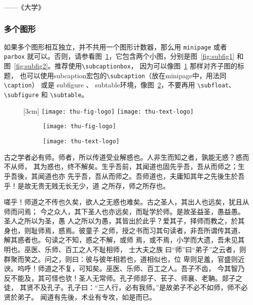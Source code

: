 \hfill ——《大学》


\subsubsection{多个图形}
\label{sec:multifig}

如果多个图形相互独立，并不共用一个图形计数器，那么用 \verb|minipage| 或者
\verb|parbox| 就可以。否则，请参看图~\ref{fig:big1-subcaptionbox}，它包含两个小图，分别是图~\ref{fig:subfig1} 
和图~\ref{fig:subfig2}。推荐使用\verb|\subcaptionbox|，
因为可以像图~\ref{fig:big1-subcaptionbox} 那样对齐子图的标题，
也可以使用\textsf{subcaption}宏包的\verb|\subcaption|（放在minipage中，用法同\verb|\caption|）
或是 subfigure 、 subtable环境，像图~\ref{fig:big1-subfigure}，不要再用 \verb|\subfloat|、
\verb|\subfigure| 和 \verb|\subtable|。
\begin{figure}[h]
  \centering%
  [3cm] %
    {\texttt{[image: thu-fig-logo]}}
      \hspace{4em}%
      {\texttt{[image: thu-text-logo]}}
  \label{fig:big1-subcaptionbox}
\end{figure}
\begin{figure}[h]
  \centering%
  \begin{subfigure}{3cm}
    \texttt{[image: thu-fig-logo]}
  \end{subfigure}
  \hspace{4em}%
  \begin{subfigure}{0.5\textwidth}
    \texttt{[image: thu-text-logo]}
  \end{subfigure}
  \label{fig:big1-subfigure}
\end{figure}
古之学者必有师。师者，所以传道受业解惑也。人非生而知之者，孰能无惑？惑而不从师，
其为惑也，终不解矣。生乎吾前，其闻道也固先乎吾，吾从而师之；生乎吾後，其闻道也亦
先乎吾，吾从而师之。吾师道也，夫庸知其年之先後生於吾乎！是故无贵无贱无长无少，道
之所存，师之所存也。

嗟乎！师道之不传也久矣，欲人之无惑也难矣。古之圣人，其出人也远矣，犹且从师而问焉；
今之众人，其下圣人也亦远矣，而耻学於师。是故圣益圣，愚益愚。圣人之所以为圣，愚
人之所以为愚，其皆出於此乎？爱其子，择师而教之，於其身也，则耻师焉，惑焉。彼童子
之师，授之书而习其句读者，非吾所谓传其道、解其惑者也。句读之不知，惑之不解，或师
焉，或不焉，小学而大遗，吾未见其明也。巫医、乐师、百工之人不耻相师，  士大夫之族
曰“师”曰“弟子”之云者，则群聚而笑之。问之，则曰：彼与彼年相若也，道相似也，位
卑则足羞，官盛则近谀。呜呼！师道之不复，可知矣。巫医、乐师、百工之人。吾子不齿，
今其智乃反不能及，其可怪也欤！圣人无常师。孔子师郯子、苌子、师襄、老聃。郯子之徒，
其贤不及孔子。孔子曰：“三人行，必有我师。”是故弟子不必不如师，师不必贤於弟子。
闻道有先後，术业有专攻，如是而已。

